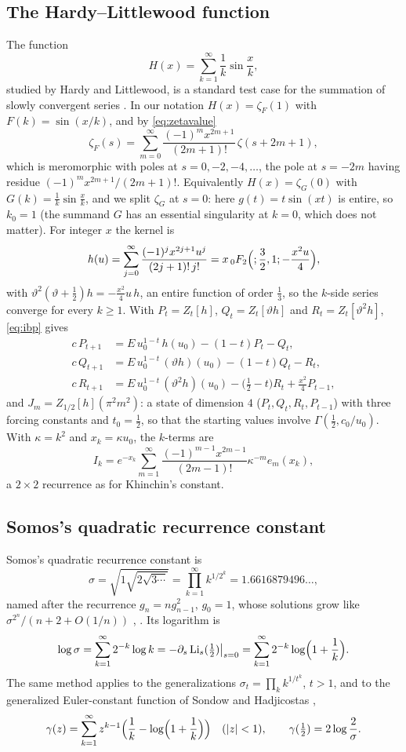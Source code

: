 \documentclass[11pt,reqno]{amsart}
\theoremstyle{definition}
\theoremstyle{remark}
\newcommand{\Li}{\operatorname{Li}}
\begin{document}
\subsection{The Hardy--Littlewood function}\label{sec:HL}
The function
\[
  H(x) = \sum_{k=1}^{\infty}\frac1k\sin\frac xk,
\]
studied by Hardy and Littlewood, is a standard test case for the summation of slowly convergent series
\cite{Gau05,Mon10}. In our notation $H(x) = \zeta_F(1)$ with $F(k) = \sin(x/k)$, and by \eqref{eq:zetavalue}
\[
  \zeta_F(s) = \sum_{m=0}^{\infty}\frac{(-1)^mx^{2m+1}}{(2m+1)!}\,\zeta(s+2m+1),
\]
which is meromorphic with poles at $s = 0, -2, -4, \dots$, the pole at $s = -2m$ having residue
$(-1)^mx^{2m+1}/(2m+1)!$. Equivalently $H(x) = \zeta_G(0)$ with $G(k) = \frac1k\sin\frac xk$, and we split $\zeta_G$ at
$s = 0$: here $g(t) = t\sin(xt)$ is entire, so $k_0 = 1$ (the summand $G$ has an essential singularity at $k = 0$, which
does not matter). For integer $x$ the kernel is
\[
  h(u) = \sum_{j=0}^{\infty}\frac{(-1)^jx^{2j+1}u^j}{(2j+1)!\,j!} = x\,{}_0F_2\Bigl(;\frac32,1;-\frac{x^2u}4\Bigr),
\]
with $\vartheta^2(\vartheta+\frac12)h = -\frac{x^2}{4}u\,h$,
an entire function of order $\frac13$, so the $k$-side series converge for every $k \ge 1$. With
$P_t = Z_t[h]$, $Q_t = Z_t[\vartheta h]$ and $R_t = Z_t[\vartheta^2h]$, \eqref{eq:ibp} gives
\begin{align*}
  c\,P_{t+1} &= E\,u_0^{1-t}\,h(u_0) - (1-t)P_t - Q_t, \\
  c\,Q_{t+1} &= E\,u_0^{1-t}\,(\vartheta h)(u_0) - (1-t)Q_t - R_t, \\
  c\,R_{t+1} &= E\,u_0^{1-t}\,(\vartheta^2h)(u_0) - \bigl(\tfrac12 - t\bigr)R_t + \tfrac{x^2}{4}P_{t-1},
\end{align*}
and $J_m = Z_{1/2}[h](\pi^2m^2)$: a state of dimension $4$ ($P_t, Q_t, R_t, P_{t-1}$) with three forcing constants and
$t_0 = \frac12$, so that the starting values involve $\Gamma(\frac12, c_0/u_0)$. With $\kappa = k^2$ and
$x_k = \kappa u_0$, the $k$-terms are
\[
  I_k = e^{-x_k}\sum_{m=1}^{\infty}\frac{(-1)^{m-1}x^{2m-1}}{(2m-1)!}\kappa^{-m}e_m(x_k),
\]
a $2\times2$ recurrence as for Khinchin's constant.

\subsection{Somos's quadratic recurrence constant}\label{sec:somos}
Somos's quadratic recurrence constant is
\[
  \sigma = \sqrt{1\sqrt{2\sqrt{3\cdots}}} = \prod_{k=1}^{\infty}k^{1/2^k} = 1.6616879496\ldots,
\]
named after the recurrence $g_n = ng_{n-1}^2$, $g_0 = 1$, whose solutions grow like $\sigma^{2^n}/(n + 2 + O(1/n))$
\cite[\S6.10]{Fin03}, \cite[A112302]{OEIS}. Its logarithm is
\[
  \log\sigma = \sum_{k=1}^{\infty}2^{-k}\log k = -\partial_s\Li_s(\tfrac12)\big|_{s=0}
  = \sum_{k=1}^{\infty}2^{-k}\log\Bigl(1+\frac1k\Bigr).
\]
The same method applies to the generalizations $\sigma_t = \prod_kk^{1/t^k}$, $t > 1$, and to the generalized
Euler-constant function of Sondow and Hadjicostas \cite{SH07},
\[
  \gamma(z) = \sum_{k=1}^{\infty}z^{k-1}\Bigl(\frac1k - \log\Bigl(1+\frac1k\Bigr)\Bigr) \quad (|z| < 1),
  \qquad \gamma(\tfrac12) = 2\log\frac2\sigma.
\]
\end{document}
